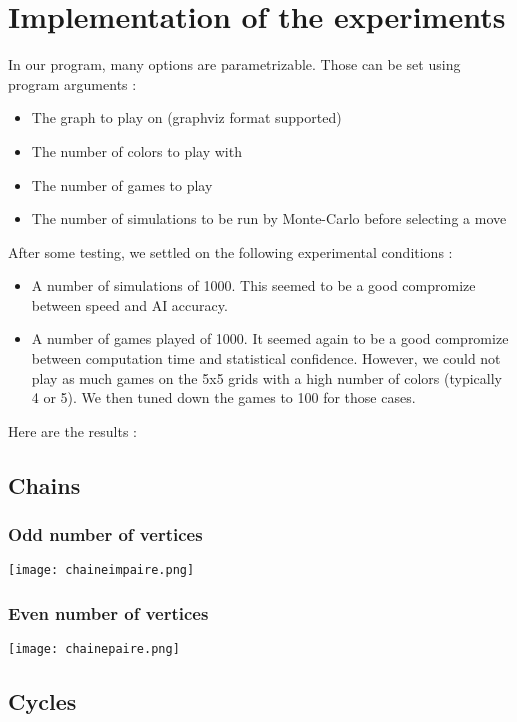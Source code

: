 \section{Implementation of the experiments}


In our program, many options are parametrizable. Those can be set using program arguments :
\begin{itemize}
\item The graph to play on (graphviz format supported)
\item The number of colors to play with
\item The number of games to play
\item The number of simulations to be run by Monte-Carlo before selecting a move
\end{itemize}
After some testing, we settled on the following experimental conditions :
\begin{itemize}
\item A number of simulations of 1000. This seemed to be a good compromize between speed and AI accuracy.
\item A number of games played of 1000. It seemed again to be a good compromize between computation time and statistical confidence. However, we could not play as much games on the 5x5 grids with a high number of colors (typically 4 or 5). We then tuned down the games to 100 for those cases. 
\end{itemize}

Here are the results :\\

\subsection{Chains}

\subsubsection{Odd number of vertices}

\texttt{[image: chaineimpaire.png]}

\subsubsection{Even number of vertices}

\texttt{[image: chainepaire.png]}

\subsection{Cycles}


